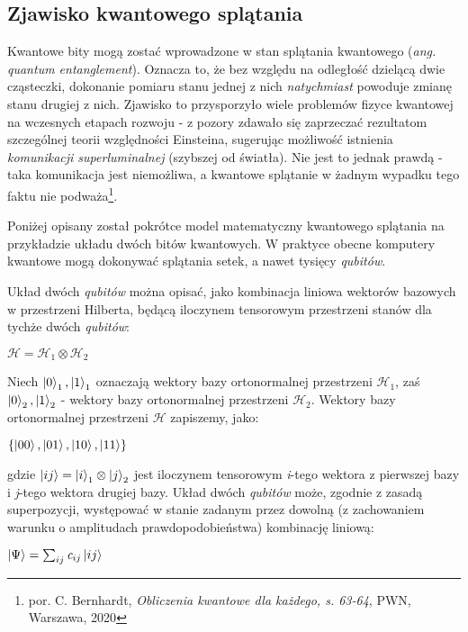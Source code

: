 \documentclass[12pt,a4paper,twoside,openany]{book}
\begin{document}
\subsection{Zjawisko kwantowego splątania}

Kwantowe bity mogą zostać wprowadzone w stan splątania kwantowego (\textit{ang. quantum entanglement}). Oznacza to, że bez względu na odległość dzielącą dwie cząsteczki, dokonanie pomiaru stanu jednej z nich \textit{natychmiast} powoduje zmianę stanu drugiej z nich. Zjawisko to przysporzyło wiele problemów fizyce kwantowej na wczesnych etapach rozwoju - z pozory zdawało się zaprzeczać rezultatom szczególnej teorii względności Einsteina, sugerując możliwość istnienia \textit{komunikacji superluminalnej} (szybszej od światła). Nie jest to jednak prawdą - taka komunikacja jest niemożliwa, a kwantowe splątanie w żadnym wypadku tego faktu nie podważa\footnote{por. C. Bernhardt, \textit{Obliczenia kwantowe dla każdego, s. 63-64}, PWN,
Warszawa, 2020}.

Poniżej opisany został pokrótce model matematyczny kwantowego splątania na przykładzie układu dwóch bitów kwantowych. W praktyce obecne komputery kwantowe mogą dokonywać splątania setek, a nawet tysięcy \textit{qubitów}.

Układ dwóch \textit{qubitów} można opisać, jako kombinacja liniowa wektorów bazowych w przestrzeni Hilberta, będącą iloczynem tensorowym przestrzeni stanów dla tychże dwóch \textit{qubitów}:

\begin{center}
    $\mathcal{H} = \mathcal{H}_1 \otimes \mathcal{H}_2$
\end{center}

Niech $\ket{0}_1, \ket{1}_1$ oznaczają wektory bazy ortonormalnej przestrzeni $\mathcal{H}_1$, zaś $\ket{0}_2, \ket{1}_2$ - wektory bazy ortonormalnej przestrzeni $\mathcal{H}_2$. Wektory bazy ortonormalnej przestrzeni $\mathcal{H}$ zapiszemy, jako: 
\begin{center}
    $\{\ket{00}, \ket{01}, \ket{10}, \ket{11}\}$
\end{center}
gdzie $\ket{ij} = \ket{i}_1 \otimes \ket{j}_2$ jest iloczynem tensorowym \textit{i}-tego wektora z pierwszej bazy i \textit{j}-tego wektora drugiej bazy.
Układ dwóch \textit{qubitów} może, zgodnie z zasadą superpozycji, występować w stanie zadanym przez dowolną (z zachowaniem warunku o amplitudach prawdopodobieństwa) kombinację liniową:
\begin{center}
    $\ket{\Psi} = \sum_{ij} \textit{c}_{ij}\ket{ij}$
\end{center}
\end{document}
